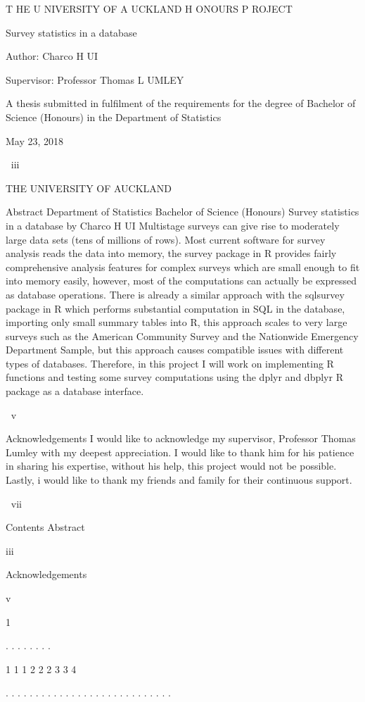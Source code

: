 T HE U NIVERSITY OF A UCKLAND
H ONOURS P ROJECT

Survey statistics in a database

Author:
Charco H UI

Supervisor:
Professor Thomas L UMLEY

A thesis submitted in fulfilment of the requirements
for the degree of Bachelor of Science (Honours)
in the
Department of Statistics

May 23, 2018

iii

THE UNIVERSITY OF AUCKLAND

Abstract
Department of Statistics
Bachelor of Science (Honours)
Survey statistics in a database
by Charco H UI
Multistage surveys can give rise to moderately large data sets (tens of millions of
rows). Most current software for survey analysis reads the data into memory, the
survey package in R provides fairly comprehensive analysis features for complex
surveys which are small enough to fit into memory easily, however, most of the
computations can actually be expressed as database operations. There is already a
similar approach with the sqlsurvey package in R which performs substantial computation in SQL in the database, importing only small summary tables into R, this
approach scales to very large surveys such as the American Community Survey and
the Nationwide Emergency Department Sample, but this approach causes compatible issues with different types of databases. Therefore, in this project I will work on
implementing R functions and testing some survey computations using the dplyr
and dbplyr R package as a database interface.

v

Acknowledgements
I would like to acknowledge my supervisor, Professor Thomas Lumley with my
deepest appreciation. I would like to thank him for his patience in sharing his expertise, without his help, this project would not be possible.
Lastly, i would like to thank my friends and family for their continuous support.

vii

Contents
Abstract

iii

Acknowledgements

v

1

.
.
.
.
.
.
.
.

1
1
1
2
2
2
3
3
4

.
.
.
.
.
.
.
.
.
.
.
.
.
.
.
.
.
.
.
.
.
.
.
.
.
.
.
.

